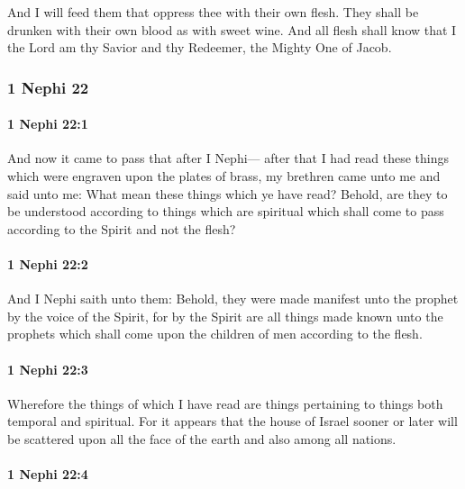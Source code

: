 			And I will feed them that oppress thee with their own flesh.
			They shall be drunken with their own blood as with sweet wine.
			And all flesh shall know that
			I the Lord am thy Savior and thy Redeemer, the Mighty One of Jacob.

	\subsubsection{1 Nephi 22} %
		\label{1NEPHI-22}
		
		\paragraph{1 Nephi 22:1} %
			\label{1 Nephi-22-1}

			And now it came to pass that after I Nephi—
			after that I had read these things which were engraven upon the plates of brass,
			my brethren came unto me and said unto me:
			What mean these things which ye have read?
			Behold, are they to be understood according to things which are spiritual
			which shall come to pass according to the Spirit and not the flesh?

		\paragraph{1 Nephi 22:2} %
			\label{1 Nephi-22-2}

			And I Nephi saith unto them:
			Behold, they were made manifest unto the prophet by the voice of the Spirit,
			for by the Spirit are all things made known unto the prophets
			which shall come upon the children of men according to the flesh.

		\paragraph{1 Nephi 22:3} %
			\label{1 Nephi-22-3}

			Wherefore the things of which I have read
			are things pertaining to things both temporal and spiritual.
			For it appears that the house of Israel sooner or later will be scattered
			upon all the face of the earth and also among all nations.

		\paragraph{1 Nephi 22:4} %
			\label{1 Nephi-22-4}

